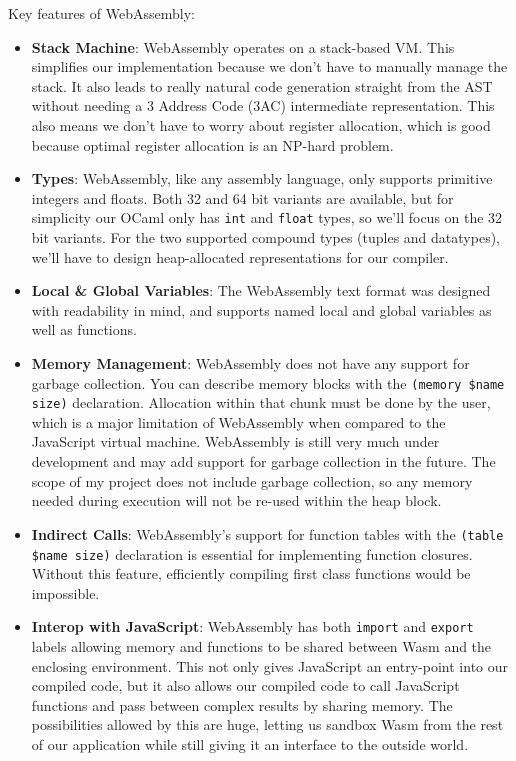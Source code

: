 \documentclass[12pt,a4paper,twoside,openright]{report}
\begin{document}
Key features of WebAssembly:
\begin{itemize}
   \item \textbf{Stack Machine}:
      WebAssembly operates on a stack-based VM.
      This simplifies our implementation because we don't have to manually manage the stack.
      It also leads to really natural code generation straight from the AST without needing a 3 Address Code (3AC) intermediate representation.
      This also means we don't have to worry about register allocation, which is good because optimal register allocation is an NP-hard problem.
   \item \textbf{Types}:
      WebAssembly, like any assembly language, only supports primitive integers and floats.
      Both 32 and 64 bit variants are available, but for simplicity our OCaml only has {\tt int}  and {\tt float} types, so we'll focus on the 32 bit variants.
      For the two supported compound types (tuples and datatypes), we'll have to design heap-allocated representations for our compiler.
   \item \textbf{Local \& Global Variables}:
      The WebAssembly text format was designed with readability in mind, and supports named local and global variables as well as functions.
   \item \textbf{Memory Management}:
      WebAssembly does not have any support for garbage collection.
      You can describe memory blocks with the {\tt (memory \$name size)} declaration.
      Allocation within that chunk must be done by the user, which is a major limitation of WebAssembly when compared to the JavaScript virtual machine.
      WebAssembly is still very much under development and may add support for garbage collection in the future.
      The scope of my project does not include garbage collection, so any memory needed during execution will not be re-used within the heap block.
   \item \textbf{Indirect Calls}:
      WebAssembly's support for function tables with the {\tt (table \$name size)} declaration is essential for implementing function closures.
      Without this feature, efficiently compiling first class functions would be impossible.
   \item \textbf{Interop with JavaScript}:
      WebAssembly has both {\tt import} and {\tt export} labels allowing memory and functions to be shared between Wasm and the enclosing environment.
      This not only gives JavaScript an entry-point into our compiled code, but it also allows our compiled code to call JavaScript functions and pass between complex results by sharing memory.
      The possibilities allowed by this are huge, letting us sandbox Wasm from the rest of our application while still giving it an interface to the outside world.
\end{itemize}
\end{document}
